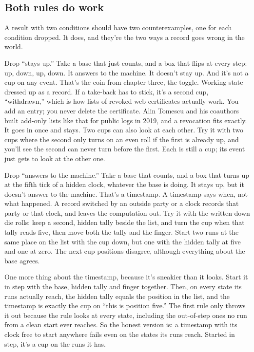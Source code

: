 \documentclass[11pt,twoside]{article}
\theoremstyle{thielethm}
\theoremstyle{thieledef}
\theoremstyle{thieledef}
\theoremstyle{thieledef}
\theoremstyle{thielethm}
\theoremstyle{thieleobs}
\theoremstyle{thielethm}
\begin{document}
\subsection{Both rules do work}

A result with two conditions should have two counterexamples, one for each condition dropped. It does, and they're the two ways a record goes wrong in the world.

Drop ``stays up.'' Take a base that just counts, and a box that flips at every step: up, down, up, down. It answers to the machine. It doesn't stay up. And it's not a cup on any event. That's the coin from chapter three, the toggle. Working state dressed up as a record. If a take-back has to stick, it's a second cup, ``withdrawn,'' which is how lists of revoked web certificates actually work. You add an entry; you never delete the certificate. Alin Tomescu and his coauthors built add-only lists like that for public logs in 2019, and a revocation fits exactly. It goes in once and stays. Two cups can also look at each other. Try it with two cups where the second only turns on an even roll if the first is already up, and you'll see the second can never turn before the first. Each is still a cup; its event just gets to look at the other one.

Drop ``answers to the machine.'' Take a base that counts, and a box that turns up at the fifth tick of a hidden clock, whatever the base is doing. It stays up, but it doesn't answer to the machine. That's a timestamp. A timestamp says when, not what happened. A record switched by an outside party or a clock records that party or that clock, and leaves the computation out. Try it with the written-down die rolls: keep a second, hidden tally beside the list, and turn the cup when that tally reads five, then move both the tally and the finger. Start two runs at the same place on the list with the cup down, but one with the hidden tally at five and one at zero. The next cup positions disagree, although everything about the base agrees.

One more thing about the timestamp, because it's sneakier than it looks. Start it in step with the base, hidden tally and finger together. Then, on every state its runs actually reach, the hidden tally equals the position in the list, and the timestamp is exactly the cup on ``this is position five.'' The first rule only throws it out because the rule looks at every state, including the out-of-step ones no run from a clean start ever reaches. So the honest version is: a timestamp with its clock free to start anywhere fails even on the states its runs reach. Started in step, it's a cup on the runs it has.
\end{document}
